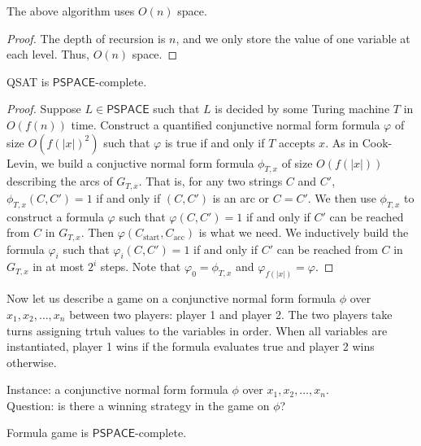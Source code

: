 \begin{proposition}[]
	The above algorithm uses $O(n)$ space.
\end{proposition}

\begin{proof}
	The depth of recursion is $n$, and we only store the value of
	one variable at each level.
	Thus, $O(n)$ space.
\end{proof}

\begin{theorem}[]
	QSAT is $\mathsf{PSPACE}$-complete.
\end{theorem}

\begin{proof}
	Suppose $L \in \mathsf{PSPACE}$ such that $L$ is decided by some
	Turing machine $T$ in $O(f(n))$ time.
	Construct a quantified conjunctive normal form formula $\varphi$ of size
	$O(f(\left\lvert x \right\rvert)^2)$ such that $\varphi$ is true
	if and only if $T$ accepts $x$.
	As in Cook-Levin, we build a conjuctive normal form formula
	$\phi_{T,x}$ of size $O(f(\left\lvert x \right\rvert))$ describing
	the arcs of $G_{T,x}$. 
	That is, for any two strings $C$ and $C'$,
	$\phi_{T,x}(C,C') = 1$ if and only if $(C,C')$ is an arc
	or $C = C'$.
	We then use $\phi_{T,x}$ to construct a formula $\varphi$ such that
	$\varphi(C,C')=1$ if and only if $C'$ can be reached from $C$ in $G_{T,x}$.
	Then $\varphi(C_{\text{start}}, C_{\text{acc}})$ is what we need.
	We inductively build the formula $\varphi_i$ such that
	$\varphi_i(C,C') = 1$ if and only if $C'$ can be reached from $C$
	in $G_{T,x}$ in at most $2^i$ steps.
	Note that $\varphi_0 = \phi_{T,x}$ and 
	$\varphi_{f(\left\lvert x \right\rvert)} = \varphi$.
\end{proof}

Now let us describe a game on a conjunctive normal form formula 
$\phi$ over $x_1, x_2, \ldots, x_n$ between two players: player 1 and player 2.
The two players take turns assigning trtuh values to the variables in order.
When all variables are instantiated, player 1 wins if the formula evaluates
true and player 2 wins otherwise.

\begin{problem}
	Instance: a conjunctive normal form formula $\phi$ over 
	$x_1, x_2, \ldots, x_n$. \\
	Question: is there a winning strategy in the game on $\phi$?
\end{problem}

\begin{theorem}[]
	Formula game is $\mathsf{PSPACE}$-complete.
\end{theorem}

